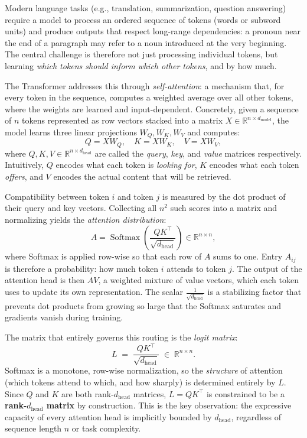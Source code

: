 Modern language tasks (e.g., translation, summarization, question answering) require a model
to process an ordered sequence of tokens (words or subword units) and produce outputs that
respect long-range dependencies: a pronoun near the end of a paragraph may refer to a
noun introduced at the very beginning. The central challenge is therefore not just
processing individual tokens, but learning \emph{which tokens should inform which other
tokens}, and by how much.

The Transformer addresses this through \emph{self-attention}:
a mechanism that, for every token in the sequence, computes a weighted average over all
other tokens, where the weights are learned and input-dependent. Concretely, given a
sequence of $n$ tokens represented as row vectors stacked into a matrix $X \in
\mathbb{R}^{n \times d_{\text{model}}}$, the model learns three linear projections
$W_Q, W_K, W_V$ and computes:
\begin{equation}
  Q = XW_Q, \quad K = XW_K, \quad V = XW_V,
  \label{eq:qkv}
\end{equation}
where $Q, K, V \in \mathbb{R}^{n \times d_{\text{head}}}$ are called the \emph{query},
\emph{key}, and \emph{value} matrices respectively. Intuitively, $Q$ encodes what each
token is \emph{looking for}, $K$ encodes what each token \emph{offers}, and $V$ encodes
the actual content that will be retrieved.

Compatibility between token $i$ and token $j$ is measured by the dot product of their
query and key vectors. Collecting all $n^2$ such scores into a matrix and normalizing
yields the \emph{attention distribution}:
\begin{equation}
  A = \operatorname{Softmax}\!\left(\frac{QK^\top}{\sqrt{d_{\text{head}}}}\right)
  \in \mathbb{R}^{n \times n},
  \label{eq:attention}
\end{equation}
where Softmax is applied row-wise so that each row of $A$ sums to one. Entry $A_{ij}$
is therefore a probability: how much token $i$ attends to token $j$. The output of the
attention head is then $AV$, a weighted mixture of value vectors, which each token uses
to update its own representation. The scalar $\frac{1}{\sqrt{d_{\text{head}}}}$ is a
stabilizing factor that prevents dot products from growing so large that the Softmax
saturates and gradients vanish during training.

The matrix that entirely governs this routing is the \emph{logit matrix}:
\begin{equation}
  L \;=\; \frac{QK^\top}{\sqrt{d_{\text{head}}}} \;\in\; \mathbb{R}^{n \times n}.
  \label{eq:logit}
\end{equation}
Softmax is a monotone, row-wise normalization, so the \emph{structure} of attention
(which tokens attend to which, and how sharply) is determined entirely by $L$. Since $Q$
and $K$ are both rank-$d_{\text{head}}$ matrices, $L = QK^\top$ is constrained to be a
\textbf{rank-$d_{\text{head}}$ matrix} by construction. This is the key observation: the
expressive capacity of every attention head is implicitly bounded by $d_{\text{head}}$,
regardless of sequence length $n$ or task complexity.

